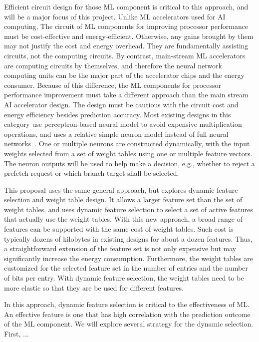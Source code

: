 

Efficient circuit design for those ML component is critical to this approach,
and will be a major focus of this project.  Unlike ML accelerators used for AI
computing, The circuit of ML components for improving processor performance must
be cost-effective and energy-efficient.  Otherwise, any gains brought by them
may not justify the cost and energy overhead.  They are fundamentally assisting
circuits, not the computing circuits.  By contrast, main-stream ML accelerators
are computing circuits by themselves, and therefore the neural network computing
units can be the major part of the accelerator chips and the energy consumer.
Because of this difference, the ML components for processor performance
improvement must take a different approach than the main stream AI accelerator
design.  The design must be cautious with the circuit cost and energy efficiency
besides prediction accuracy.  Most existing designs in this category use
perceptron-based neural model to avoid expensive multiplication operations, and
uses a relative simple neuron model instead of full neural networks~\cite{}.
One or multiple neurons are constructed dynamically, with the input weights
selected from a set of weight tables using one or multiple feature vectors.  The
neuron outputs will be used to help make a decision, e.g., whether to reject a
prefetch request or which branch target shall be selected.

This proposal uses the same general approach, but explores dynamic feature
selection and weight table design.  It allows a larger feature set than the set
of weight tables, and uses dynamic feature selection to select a set of active
features that actually use the weight tables.  With this new approach, a broad
range of features can be supported with the same cost of weight tables.  Such
cost is typically dozens of kilobytes in existing designs for about a dozen
features.  Thus, a straightforward extension of the feature set is not only
expensive but may significantly increase the energy consumption.  Furthermore,
the weight tables are customized for the selected feature set in the number of
entries and the number of bits per entry.  With dynamic feature selection, the
weight tables need to be more elastic so that they are be used for different
features.

In this approach, dynamic feature selection is critical to the effectiveness of
ML.  An effective feature is one that has high correlation with the prediction
outcome of the ML component.  We will explore several strategy for the dynamic
selection. First, ...

